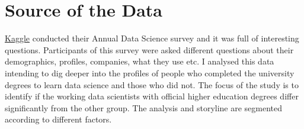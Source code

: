 \section{Source of the Data}

\href{www.kaggle.com}{Kaggle} conducted their Annual Data Science survey and it was full of interesting questions. Participants of this survey were asked different questions about their demographics, profiles, companies, what they use etc. I analysed this data intending to dig deeper into the profiles of people who completed the university degrees to learn data science and those who did not. The focus of the study is to identify if the working data scientists with official higher education degrees differ significantly from the other group. The analysis and storyline are segmented according to different factors.

